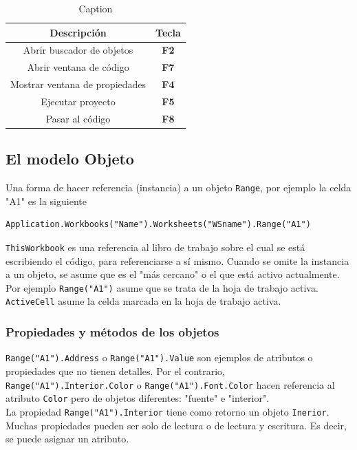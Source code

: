 \begin{table}[H]
    \centering
    \begin{tabular}{|c||c|}
        \hline
        Descripción & Tecla \\ \hline
        Abrir buscador de objetos & \textbf{F2} \\ \hline
        Abrir ventana de código & \textbf{F7} \\ \hline
        Mostrar ventana de propiedades & \textbf{F4} \\ \hline
        Ejecutar proyecto & \textbf{F5} \\ \hline
        Pasar al código & \textbf{F8} \\ \hline
    \end{tabular}
    \caption{Caption}
    \label{tab:my_label}
\end{table}

\subsection{El modelo Objeto}

Una forma de hacer referencia (instancia) a un objeto \texttt{Range}, por ejemplo la celda "A1" es la siguiente

\begin{verbatim}
Application.Workbooks("Name").Worksheets("WSname").Range("A1")
\end{verbatim}

\texttt{ThisWorkbook} es una referencia al libro de trabajo sobre el cual se está escribiendo el código, para referenciarse a sí mismo. Cuando se omite la instancia a un objeto, se asume que es el "más cercano" o el que está activo actualmente. Por ejemplo \texttt{Range("A1")} asume que se trata de la hoja de trabajo activa. \texttt{ActiveCell} asume la celda marcada en la hoja de trabajo activa.

\subsubsection{Propiedades y métodos de los objetos}

\texttt{Range("A1").Address} o \texttt{Range("A1").Value} son ejemplos de atributos o propiedades que no tienen detalles. Por el contrario, \texttt{Range("A1").Interior.Color} o \texttt{Range("A1").Font.Color} hacen referencia al atributo \texttt{Color} pero de objetos diferentes: "fuente" e "interior". \\

La propiedad \texttt{Range("A1").Interior} tiene como retorno un objeto \texttt{Inerior}. Muchas propiedades pueden ser solo de lectura o de lectura y escritura. Es decir, se puede asignar un atributo.

